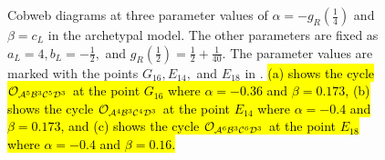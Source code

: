 \begin{figure}
	\centering
	\caption[Cobweb diagrams of the archetypal model]{
		Cobweb diagrams at three parameter values of $\alpha = -g_R\left(\frac{1}{4}\right)$ and $\beta = c_L$ in the archetypal model.
		The other parameters are fixed as $a_L = 4, b_L = -\frac{1}{2},$ and $g_R\left(\frac{1}{2}\right) = \frac{1}{2} + \frac{1}{40}$.
		The parameter values are marked with the points $G_{16}, E_{14},$ and $E_{18}$ in .
		\hl{
			(a) shows the cycle $\mathcal{O}_{\mathcal{A}^5\mathcal{B}^3\mathcal{C}^5\mathcal{D}^3}$ at the point $G_{16}$ where $\alpha = -0.36$ and $\beta = 0.173$,
			(b) shows the cycle $\mathcal{O}_{\mathcal{A}^4\mathcal{B}^3\mathcal{C}^4\mathcal{D}^3}$ at the point $E_{14}$ where $\alpha = -0.4$ and $\beta = 0.173$,
			and (c) shows the cycle $\mathcal{O}_{\mathcal{A}^6\mathcal{B}^3\mathcal{C}^6\mathcal{D}^3}$ at the point $E_{18}$ where $\alpha = -0.4$ and $\beta = 0.16$.
		}
	}
	\label{fig:arch.dyn.cobwebs.3}
\end{figure}

